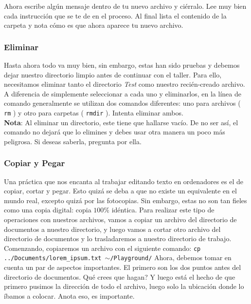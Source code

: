 \documentclass[10pt,letterpaper]{article}
\newcommand{\inlinecode}[1]{
\colorbox{light-gray}{\texttt{#1}}
}
\begin{document}
Ahora escribe alg\'un mensaje dentro de tu nuevo archivo y ci\'erralo. Lee muy bien cada instrucci\'on que se te de en el proceso. Al final lista el contenido de la carpeta y nota c\'omo es que ahora aparece tu nuevo archivo.

\subsubsection{Eliminar}
Hasta ahora todo va muy bien, sin embargo, estas han sido pruebas y debemos dejar nuestro directorio limpio antes de continuar con el taller. Para ello, necesitamos eliminar tanto el directorio \emph{Test} como nuestro reci\'en-creado archivo. A diferencia de simplemente seleccionar a cada uno y eliminarlos, en la l\'inea de comando generalmente se utilizan dos comandos diferentes: uno para archivos (\inlinecode{rm}) y otro para carpetas (\inlinecode{rmdir}). Intenta eliminar ambos.\\

\textbf{Nota}: Al eliminar un directorio, este tiene que hallarse vac\'io. De no ser as\'i, el comando no dejar\'a que lo elimines  y debes usar otra manera un poco m\'as peligrosa. Si deseas saberla, pregunta por ella.

\subsubsection{Copiar y Pegar}
Una pr\'actica que nos encanta al trabajar editando texto en ordenadores es el de copiar, cortar y pegar. Esto quiz\'a se deba a que no existe un equivalente en el mundo real, excepto quiz\'a por las fotocopias. Sin embargo, estas no son tan fieles como una copia digital: copia $100\%$ id\'entica. Para realizar este tipo de operaciones con nuestros archivos, vamos a copiar un archivo del directorio de documentos a nuestro directorio, y luego vamos a cortar otro archivo del directorio de documentos y lo trasladaremos a nuestro directorio de trabajo.\\

Comenzando, copiaremos un archivo con el siguiente comando: \inlinecode{cp ../Documents/lorem\_ipsum.txt $\sim$/Playground/} Ahora, debemos tomar en cuenta un par de aspectos importantes. El primero son los dos puntos antes del directorio de documentos. Qu\'e crees que hagan? Y luego est\'a el hecho de que primero pusimos la direcci\'on de todo el archivo, luego solo la ubicaci\'on donde lo \'ibamos a colocar. Anota eso, es importante.\\
\end{document}
